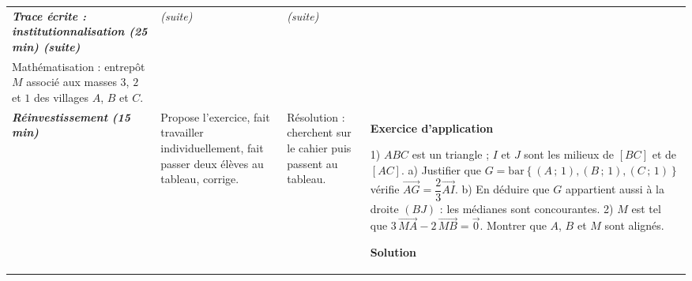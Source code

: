 \documentclass[10pt,a4paper,landscape]{article}
\newcommand{\vc}[1]{\overrightarrow{#1}}                                 %
\newcommand{\barG}[1]{\mathrm{bar}\left\{#1\right\}}                      %
\newcommand{\bleu}[1]{{\color{cBleu}\bfseries #1}}                        %
\newcommand{\moment}[1]{\textbf{\itshape #1}}                             %
\begin{document}
{\begin{longtable}{|J{2.12cm}|L{5.17cm}|L{4.37cm}|L{13.64cm}|}
\\
\hline
\moment{Trace écrite : institutionnalisation (25 min) (suite)} &
\par{\centering\itshape (suite)\par} &
\par{\centering\itshape (suite)\par} &
\par\smallskip\par{\centering
{}\\[2pt]{\footnotesize Ma\-thé\-ma\-ti\-sa\-tion : entrepôt $M$ associé aux masses $3$, $2$ et $1$ des villages $A$, $B$ et $C$.}
\par}\par\smallskip

\\
\hline
\moment{Ré\-in\-ves\-tis\-se\-ment (15 min)} &
Propose l'exercice, fait travailler individuellement, fait passer deux élèves au tableau, corrige. &
Résolution : cherchent sur le cahier puis passent au tableau. &
\bleu{Exercice d'application}

1) $ABC$ est un triangle ; $I$ et $J$ sont les milieux de $[BC]$ et de $[AC]$.
a) Justifier que $G=\barG{(A\,;\,1),(B\,;\,1),(C\,;\,1)}$ vérifie $\vc{AG}=\dfrac{2}{3}\vc{AI}$.
b) En déduire que $G$ appartient aussi à la droite $(BJ)$ : les médianes sont concourantes.
2) $M$ est tel que $3\,\vc{MA}-2\,\vc{MB}=\vc{0}$. Montrer que $A$, $B$ et $M$ sont alignés.

\bleu{Solution}


\end{longtable}}
\end{document}
